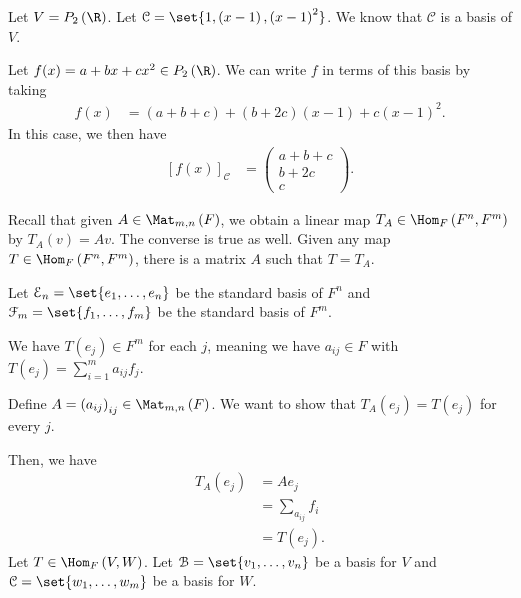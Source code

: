 \documentclass[10pt]{mypackage}
\begin{document}
\begin{example}
  Let $V = P_2\left(\R\right)$. Let $\mathcal{C} = \set{1,\left(x-1\right),\left(x-1\right)^2}$. We  know that $\mathcal{C}$ is a basis of $V$.\newline

  Let $f(x) = a + bx + cx^2\in P_2\left(\R\right)$. We can write $f$ in terms of this basis by taking
  \begin{align*}
    f(x) &= \left(a+b+c\right) + \left(b+2c\right)\left(x-1\right) + c\left(x-1\right)^2.
  \end{align*}
  In this case, we then have
  \begin{align*}
    \left[f(x)\right]_{\mathcal{C}} &= \begin{pmatrix}a+b+c\\b+2c\\c\end{pmatrix}.
  \end{align*}
\end{example}
Recall that given $A\in \Mat_{m,n}\left(F\right)$, we obtain a linear map $T_{A}\in \Hom_{F}\left(F^{n},F^{m}\right)$ by $T_A\left(v\right) = Av$. The converse is true as well. Given any map $T\in \Hom_{F}\left(F^{n},F^{m}\right)$, there is a matrix $A$ such that $T = T_A$.\newline

Let $\mathcal{E}_n = \set{e_1,\dots,e_n}$ be the standard basis of $F^n$ and $\mathcal{F}_m = \set{f_1,\dots,f_m}$ be the standard basis of $F^{m}$.\newline

We have $T\left(e_j\right)\in F^m$ for each $j$, meaning we have $a_{ij}\in F$ with $T\left(e_j\right) = \sum_{i=1}^{m}a_{ij}f_j$.\newline

Define $A = \left(a_{ij}\right)_{ij}\in \Mat_{m,n}\left(F\right)$. We want to show that $T_A\left(e_j\right) = T\left(e_j\right)$ for every $j$.\newline

Then, we have
\begin{align*}
  T_A\left(e_j\right) &= Ae_j\\
                      &= \sum_{a_{ij}}f_i\\
                      &= T\left(e_j\right).
\end{align*}
Let $T\in \Hom_{F}\left(V,W\right)$. Let $\mathcal{B} = \set{v_1,\dots,v_n}$ be a basis for $V$ and $\mathcal{C} = \set{w_1,\dots,w_m}$ be a basis for $W$.\newline
\end{document}
